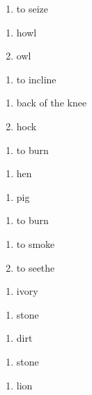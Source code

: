 \begin{enumerate}
\item to seize
\end{enumerate}
\begin{enumerate}
\item howl
\item owl
\end{enumerate}
\begin{enumerate}
\item to incline
\end{enumerate}
\begin{enumerate}
\item back of the knee
\item hock
\end{enumerate}
\begin{enumerate}
\item to burn
\end{enumerate}
\begin{enumerate}
\item hen
\end{enumerate}
\begin{enumerate}
\item pig
\end{enumerate}
\begin{enumerate}
\item to burn
\end{enumerate}
\begin{enumerate}
\item to smoke
\item to seethe
\end{enumerate}
\begin{enumerate}
\item ivory
\end{enumerate}
\begin{enumerate}
\item stone
\end{enumerate}
\begin{enumerate}
\item dirt
\end{enumerate}
\begin{enumerate}
\item stone
\end{enumerate}
\begin{enumerate}
\item lion
\end{enumerate}
